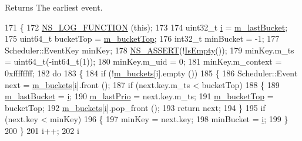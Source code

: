 \begin{DoxyReturn}{Returns}
The earliest event. 
\end{DoxyReturn}

\begin{DoxyCode}
171 \{
172   \hyperlink{log-macros-disabled_8h_a90b90d5bad1f39cb1b64923ea94c0761}{NS\_LOG\_FUNCTION} (\textcolor{keyword}{this});
173 
174   uint32\_t \hyperlink{bernuolliDistribution_8m_a6f6ccfcf58b31cb6412107d9d5281426}{i} = \hyperlink{classns3_1_1CalendarScheduler_aac53aae4bda7758ba73e45bfe775fec0}{m\_lastBucket};
175   uint64\_t bucketTop = \hyperlink{classns3_1_1CalendarScheduler_a8a8746e4fc94345c5584629b78b25549}{m\_bucketTop};
176   int32\_t minBucket = -1;
177   Scheduler::EventKey minKey;
178   \hyperlink{assert_8h_a6dccdb0de9b252f60088ce281c49d052}{NS\_ASSERT}(!\hyperlink{classns3_1_1CalendarScheduler_a3b77785ce158cd5c3979acf5ed0ae7a0}{IsEmpty}());
179   minKey.m\_ts = uint64\_t(-int64\_t(1));
180   minKey.m\_uid = 0;
181   minKey.m\_context = 0xffffffff;
182   \textcolor{keywordflow}{do}
183     \{
184       \textcolor{keywordflow}{if} (!\hyperlink{classns3_1_1CalendarScheduler_ad022479890e917ef6a64ef814284033e}{m\_buckets}[i].empty ())
185         \{
186           Scheduler::Event next = \hyperlink{classns3_1_1CalendarScheduler_ad022479890e917ef6a64ef814284033e}{m\_buckets}[\hyperlink{bernuolliDistribution_8m_a6f6ccfcf58b31cb6412107d9d5281426}{i}].front ();
187           \textcolor{keywordflow}{if} (next.key.m\_ts < bucketTop)
188             \{
189               \hyperlink{classns3_1_1CalendarScheduler_aac53aae4bda7758ba73e45bfe775fec0}{m\_lastBucket} = \hyperlink{bernuolliDistribution_8m_a6f6ccfcf58b31cb6412107d9d5281426}{i};
190               \hyperlink{classns3_1_1CalendarScheduler_ac0e4ff83ceeb795f92af7a52d48ec41b}{m\_lastPrio} = next.key.m\_ts;
191               \hyperlink{classns3_1_1CalendarScheduler_a8a8746e4fc94345c5584629b78b25549}{m\_bucketTop} = bucketTop;
192               \hyperlink{classns3_1_1CalendarScheduler_ad022479890e917ef6a64ef814284033e}{m\_buckets}[\hyperlink{bernuolliDistribution_8m_a6f6ccfcf58b31cb6412107d9d5281426}{i}].pop\_front ();
193               \textcolor{keywordflow}{return} next;
194             \}
195           \textcolor{keywordflow}{if} (next.key < minKey)
196             \{
197               minKey = next.key;
198               minBucket = \hyperlink{bernuolliDistribution_8m_a6f6ccfcf58b31cb6412107d9d5281426}{i};
199             \}
200         \}
201       i++;
202       i %

\end{DoxyCode}
